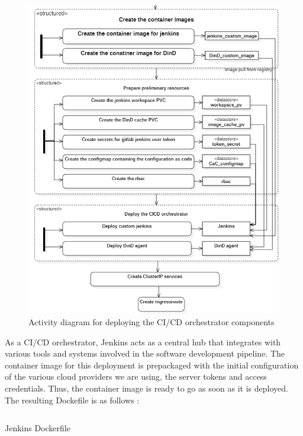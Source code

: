  

\begin{figure}[H]\centering
\includegraphics[width=1.0\textwidth,angle=00]{assets/f44.png}
\caption{Activity diagram for deploying the CI/CD orchestrator components}
\label{fig:Activity diagram for deploying the CI/CD orchestrator components}
\end{figure}
 

As a CI/CD orchestrator, Jenkins acts as a central hub that integrates with various tools and systems involved in the software development pipeline. The container image for this deployment is prepackaged with the initial configuration of the various cloud providers we are using, the server tokens and access credentials. Thus, the container image is ready to go as soon as it is deployed. The resulting Dockefile is as follows : 

\begin{listing}[H]
    \inputminted{Dockerfile}{codeListing/jenkins_Dockerfile}
    \caption{Jenkins Dockerfile}
    \label{lst:Jenkins Dockerfile}
\end{listing}

